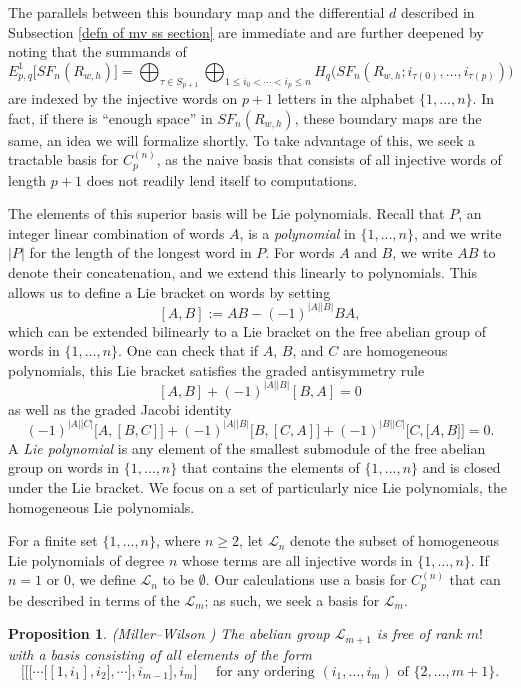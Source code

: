 \documentclass[pagebackref,colorlinks,citecolor=blue,linkcolor=blue,urlcolor=blue,filecolor=blue]{article}
\newtheorem{prop}[thm]{Proposition}
\theoremstyle{definition}\newtheorem{definition}[thm]{Definition}
\theoremstyle{definition}
\begin{document}
The parallels between this boundary map and the differential $d$ described in Subsection \ref{defn of mv ss section} are immediate and are further deepened by noting that the summands of
\[
E^{1}_{p,q}\big[SF_{n}(R_{w,h})\big]=\bigoplus_{\tau\in S_{p+1}}\bigoplus_{1\le i_{0}<\cdots<i_{p}\le n}H_{q}\big(SF_{n}(R_{w,h};  i_{\tau(0)}, \dots, i_{\tau(p)})\big)
\]
are indexed by the injective words on $p+1$ letters in the alphabet $\{1,\dots, n\}$.
In fact, if there is ``enough space'' in $SF_{n}(R_{w,h})$, these boundary maps are the same, an idea we will formalize shortly.
To take advantage of this, we seek a tractable basis for $C^{(n)}_{p}$, as the naive basis that consists of all injective words of length $p+1$ does not readily lend itself to computations.

The elements of this superior basis will be Lie polynomials.
Recall that $P$, an integer linear combination of words $A$, is a \emph{polynomial} in $\{1,\dots, n\}$, and we write $|P|$ for the length of the longest word in $P$.
For words $A$ and $B$, we write $AB$ to denote their concatenation, and we extend this linearly to polynomials.
This allows us to define a Lie bracket on words by setting
\[
[A,B]:=AB-(-1)^{|A||B|}BA,
\]
which can be extended bilinearly to a Lie bracket on the free abelian group of words in $\{1,\dots, n\}$.
One can check that if $A$, $B$, and $C$ are homogeneous polynomials, this Lie bracket satisfies the graded antisymmetry rule
\[
[A,B]+(-1)^{|A||B|}[B,A]=0
\]
as well as the graded Jacobi identity
\[
(-1)^{|A||C|}\big[A,[B,C]\big]+(-1)^{|A||B|}\big[B,[C,A]\big]+(-1)^{|B||C|}\big[C,\big[A,B]\big]=0.
\]
A \emph{Lie polynomial} is any element of the smallest submodule of the free abelian group on words in $\{1, \dots, n\}$ that contains the elements of $\{1,\dots, n\}$ and is closed under the Lie bracket.
We focus on a set of particularly nice Lie polynomials, the homogeneous Lie polynomials.

For a finite set $\{1,\dots, n\}$, where $n\ge 2$, let $\mathcal{L}_{n}$ denote the subset of homogeneous Lie polynomials of degree $n$ whose terms are all injective words in $\{1,\dots, n\}$.
If $n=1$ or $0$, we define $\mathcal{L}_{n}$ to be $\emptyset$.
Our calculations use a basis for $C^{(n)}_{p}$ that can be described in terms of the $\mathcal{L}_{m}$; as such, we seek a basis for $\mathcal{L}_{m}$.

\begin{prop}\label{Reutenauer basis}
(Miller--Wilson \cite[Theorem 2.33]{miller2019higher})
The abelian group $\mathcal{L}_{m+1}$ is free of rank $m!$ with a basis consisting of all elements of the form
\[
\Bigg[\bigg[\Big[\cdots\big[[1,i_{1}], i_{2}\big],\cdots\Big], i_{m-1}\bigg], i_{m}\Bigg] \quad \text{ for any ordering }(i_{1}, \dots, i_{m})\text{ of }\{2,\dots, m+1\}.
\]
\end{prop}
\end{document}

